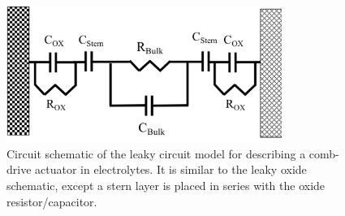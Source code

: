 \begin{figure}[htpb]
\begin{minipage}{\textwidth}
    \end{minipage} \vfill
    \begin{minipage}{\textwidth}
        \centering
        \includegraphics[width=0.8\textwidth]{Chapter3/figure/leaky_ox_stern_circuit.png} %
        \caption{Circuit schematic of the leaky circuit model for describing a comb-drive actuator in electrolytes. It is similar to the leaky oxide schematic, except a stern layer is placed in series with the oxide resistor/capacitor.}\label{leaky_ox_stern_circuit}
    \end{minipage} \vfill
\end{figure}

